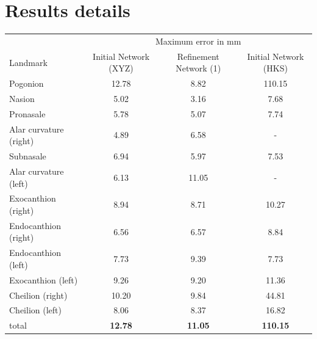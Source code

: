 \documentclass[class=article, crop=false]{standalone}
\begin{document}
\section{Results details}
\label{sec:app_results}
\begin{table}[!htbp]
\label{table:ref_hks_max}
\begin{tabularx}{\textwidth}{l|c|c|c}
\toprule
 & \multicolumn{3}{c}{Maximum error in mm} \\\cmidrule(lr){2-4}
Landmark               & \hspace{0.3cm}Initial Network (XYZ)\hspace{0.3cm}\hspace{0.5cm}&\hspace{0.3cm} Refinement Network (1)\hspace{0.3cm}  & \hspace{0.3cm}Initial Network (HKS) \hspace{0.3cm}    
\\
\midrule
Pogonion               & 12.78 & 8.82 & 110.15\\
Nasion                 & 5.02  & 3.16 & 7.68\\ %
Pronasale              & 5.78  & 5.07 & 7.74\\
Alar curvature (right) & 4.89  & 6.58 & -\\
Subnasale              & 6.94  & 5.97 & 7.53 \\
Alar curvature (left)  & 6.13  & 11.05 & - \\
Exocanthion (right)    & 8.94  & 8.71 & 10.27\\
Endocanthion (right)   & 6.56  & 6.57 & 8.84\\
Endocanthion (left)    & 7.73  & 9.39 & 7.73\\
Exocanthion (left)     & 9.26  & 9.20 & 11.36\\
Cheilion (right)       & 10.20 & 9.84 & 44.81\\
Cheilion (left)        & 8.06  & 8.37 & 16.82\\
\bottomrule
total & \textbf{12.78} & \textbf{11.05} & \textbf{110.15}
\end{tabularx}
\end{table}
\end{document}
